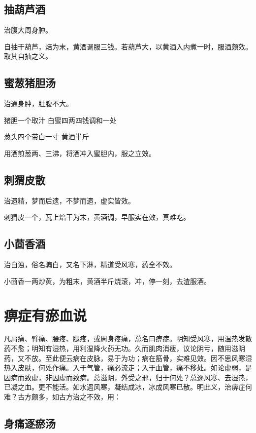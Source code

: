 \documentclass[a4paper,12pt,UTF8,twoside]{ctexbook}
\begin{document}
	\section{抽葫芦酒}
	
	
	治腹大周身肿。
	
	自抽干葫芦，焙为末，黄酒调服三钱。若葫芦大，以黄酒入内煮一时，服酒颇效。取其自抽之义。
	
	\section{蜜葱猪胆汤}
	
	
	治通身肿，肚腹不大。
	
	猪胆一个取汁 白蜜四两四钱调和一处
	
	葱头四个带白一寸 黄酒半斤
	
	用酒煎葱两、三沸，将酒冲入蜜胆内，服之立效。
	
	\section{刺猬皮散}
	
	
	治遗精，梦而后遗，不梦而遗，虚实皆效。
	
	刺猬皮一个，瓦上焙干为末，黄酒调，早服实在效，真难吃。
	
	\section{小茴香酒}
	
	
	治白浊，俗名骗白，又名下淋，精道受风寒，药全不效。
	
	小茴香一两炒黄，为粗末，黄酒半斤烧滚，冲，停一刻，去渣服酒。
	
	\chapter{痹症有瘀血说}
	凡肩痛、臂痛、腰疼、腿疼，或周身疼痛，总名曰痹症。明知受风寒，用温热发散药不愈；明知有湿热，用利湿降火药无功。久而肌肉消瘦，议论阴亏，随用滋阴药，又不放。至此便云病在皮脉，易于为功；病在筋骨，实难见效。因不思风寒湿热入皮肤，何处作痛。入于气管，痛必流走；入于血管，痛不移处。如论虚弱，是因病而致虚，非因虚而致病。总滋阴，外受之邪，归于何处？总逐风寒、去湿热，已凝之血。更不能活。如水遇风寒，凝结成冰，冰成风寒已散。明此义，治痹症何难？古方颇多，如古方治之不效，用：
	\section{身痛逐瘀汤}
	
\end{document}
